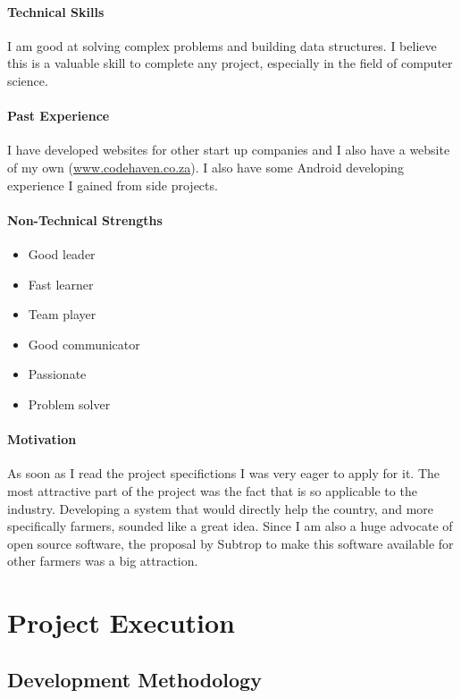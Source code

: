 \documentclass[english]{article}
\begin{document}
			\paragraph{Technical Skills}
			I am good at solving complex problems and building data structures. I believe this is a valuable skill to complete any project, especially in the field of computer science.
			
			\paragraph{Past Experience}
			I have developed websites for other start up companies and I also have a website of my own (\href{http://www.codehaven.co.za}{www.codehaven.co.za}). I also have some Android developing experience I gained from side projects.
			
			\paragraph{Non-Technical Strengths}
			\begin{itemize}
				\setlength\itemsep{0.2em}
				\item Good leader
				\item Fast learner
				\item Team player
				\item Good communicator
				\item Passionate
				\item Problem solver
			\end{itemize}
			
			\paragraph{Motivation}
			As soon as I read the project specifictions I was very eager to apply for it. The most attractive part of the project was the fact that is so applicable to the industry. Developing a system that would directly help the country, and more specifically farmers, sounded like a great idea. Since I am also a huge advocate of open source software, the proposal by Subtrop to make this software available for other farmers was a big attraction.
			
	\section{Project Execution}
		\subsection{Development Methodology}
\end{document}
